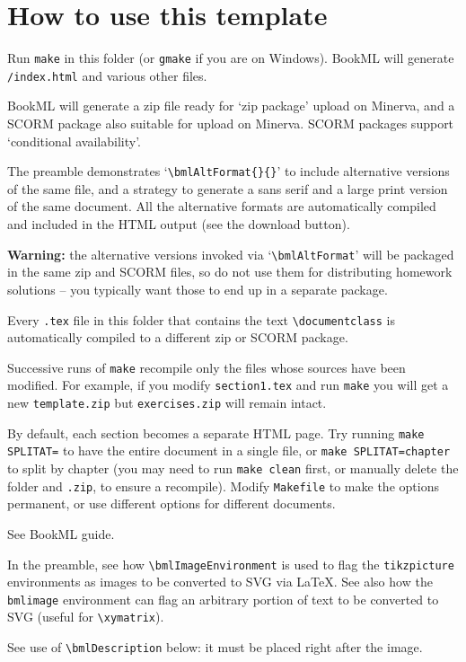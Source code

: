 \section{How to use this template}

\begin{description}[leftmargin=1em,itemsep=1em] %
  \item[How to compile this document] Run \texttt{make} in this folder (or \texttt{gmake} if you are on Windows). BookML will generate \texttt{\jobname/index.html} and various other files.
  \item[The outputs] BookML will generate a zip file ready for `zip package' upload on Minerva, and a SCORM package also suitable for upload on Minerva. SCORM packages support `conditional availability'.
  \item[Alternative formats] The preamble demonstrates `\texttt{\textbackslash{}bmlAltFormat\{\}\{\}}' to include alternative versions of the same file, and a strategy to generate a sans serif and a large print version of the same document. All the alternative formats are automatically compiled and included in the HTML output (see the download button).

  \textbf{Warning:} the alternative versions invoked via `\texttt{\textbackslash{}bmlAltFormat}' will be packaged in the same zip and SCORM files, so do not use them for distributing homework solutions -- you typically want those to end up in a separate package.
  \item[Multiple packages] Every \texttt{.tex} file in this folder that contains the text \texttt{\textbackslash{}documentclass} is automatically compiled to a different zip or SCORM package.
  \item[Recompilation] Successive runs of \texttt{make} recompile only the files whose sources have been modified. For example, if you modify \texttt{section1.tex} and run \texttt{make} you will get a new \texttt{template.zip} but \texttt{exercises.zip} will remain intact.
  \item[Splitting by chapter] By default, each section becomes a separate HTML page. Try running \texttt{make SPLITAT=} to have the entire document in a single file, or \texttt{make SPLITAT=chapter} to split by chapter (you may need to run \texttt{make clean} first, or manually delete the folder \texttt{\jobname} and \texttt{\jobname.zip}, to ensure a recompile). Modify \texttt{Makefile} to make the options permanent, or use different options for different documents.
  \item[Requirements] See BookML guide.
  \item[Ti\emph{k}Z] In the preamble, see how \texttt{\textbackslash{}bmlImageEnvironment} is used to flag the \texttt{tikzpicture} environments as images to be converted to SVG via \LaTeX{}. See also how the \texttt{bmlimage} environment can flag an arbitrary portion of text to be converted to SVG (useful for \texttt{\textbackslash{}xymatrix}).
  \item[Images and alt text] See use of \texttt{\textbackslash{}bmlDescription} below: it must be placed right after the image.
\end{description}

